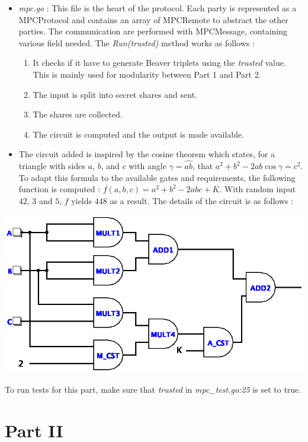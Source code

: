 \documentclass[10pt,conference]{IEEEtran}
\begin{document}
\begin{itemize}
\begin{itemize}
        \end{itemize}
    \item \textit{mpc.go} : This file is the heart of the protocol. Each party is represented as a MPCProtocol and contains an array of MPCRemote to abstract the other parties. The communication are performed with MPCMessage, containing various field needed. The \textit{Run(trusted)} method works as follows :
        \begin{enumerate}
            \item It checks if it have to generate Beaver triplets using the \textit{trusted} value. This is mainly used for modularity between Part 1 and Part 2.
            \item The input is split into secret shares and sent.
            \item The shares are collected.
            \item The circuit is computed and the output is made available.
        \end{enumerate}
    \item The circuit added is inspired by the cosine theorem which states, for a triangle with sides $a$, $b$, and $c$ with angle $\gamma = \widehat{ab}$, that $a^2 + b^2 - 2ab\cos\gamma = c^2$. To adapt this formula to the available gates and requirements, the following function is computed : $f(a,b,c) = a^2 + b^2 - 2abc + K$. With random input $42$, $3$ and $5$, $f$ yields $448$ as a result. The details of the circuit is as follows :
\end{itemize}
\begin{center}
        \includegraphics[scale=0.3]{main.png}
\end{center}
To run tests for this part, make sure that \textit{trusted} in \textit{mpc\_test.go:25} is set to true.

\section{Part II}
\end{document}
